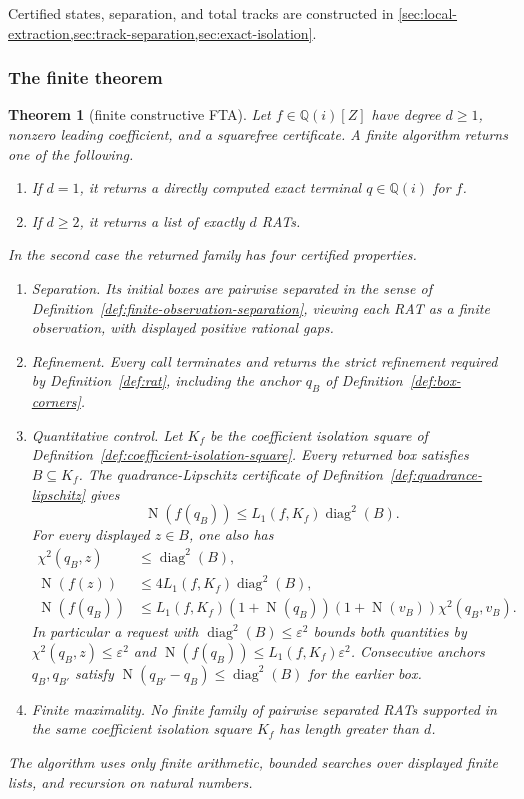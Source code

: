 \documentclass[11pt]{article}
\newtheorem{theorem}{Theorem}[section]
\newcommand{\Qi}{\mathbb{Q}(i)}
\newcommand{\Norm}[1]{\operatorname{N}\!\left(#1\right)}
\newcommand{\diamq}{\operatorname{diag}^{2}}
\newcommand{\eps}{\varepsilon}
\newcommand{\Defref}[1]{Definition~\ref{#1}}
\begin{document}
Certified states, separation, and total tracks are constructed in
\cref{sec:local-extraction,sec:track-separation,sec:exact-isolation}.

\subsubsection{The finite theorem}

\begin{theorem}[finite constructive FTA]
\label{thm:main}
Let $f\in\Qi[Z]$ have degree $d\ge1$, nonzero leading coefficient, and a
squarefree certificate.  A finite algorithm returns one of the following.
\begin{enumerate}[label=(\roman*)]
\item If $d=1$, it returns a directly computed exact terminal $q\in\Qi$ for
$f$.
\item If $d\ge2$, it returns a list of exactly $d$ RATs.
\end{enumerate}
In the second case the returned family has four certified properties.
\begin{enumerate}[label=(\alph*)]
\item \emph{Separation.}  Its initial boxes are pairwise separated in the
sense of \Defref{def:finite-observation-separation}, viewing each RAT as a
finite observation, with displayed positive rational gaps.
\item \emph{Refinement.}  Every call terminates and returns the strict
refinement required by \Defref{def:rat}, including the anchor $q_B$ of
\Defref{def:box-corners}.
\item \emph{Quantitative control.}  Let $K_f$ be the coefficient isolation
square of \Defref{def:coefficient-isolation-square}.  Every returned box
satisfies $B\subseteq K_f$.  The quadrance-Lipschitz certificate of
\Defref{def:quadrance-lipschitz} gives
\[
             \Norm{f(q_B)}\le L_1(f,K_f)\diamq(B).
\]
For every displayed $z\in B$, one also has
\[
 \begin{aligned}
 \chi^2(q_B,z)&\le\diamq(B),\\
 \Norm{f(z)}&\le4L_1(f,K_f)\diamq(B),\\
 \Norm{f(q_B)}&\le
 L_1(f,K_f)(1+\Norm{q_B})(1+\Norm{v_B})\chi^2(q_B,v_B).
 \end{aligned}
\]
In particular a request with $\diamq(B)\le\eps^2$ bounds both quantities by
$\chi^2(q_B,z)\le\eps^2$ and
$\Norm{f(q_B)}\le L_1(f,K_f)\eps^2$.  Consecutive anchors $q_B,q_{B'}$ satisfy
$\Norm{q_{B'}-q_B}\le\diamq(B)$ for the earlier box.
\item \emph{Finite maximality.}  No finite family of pairwise separated RATs
supported in the same coefficient isolation square $K_f$ has length greater
than $d$.
\end{enumerate}
The algorithm uses only finite arithmetic, bounded searches over displayed
finite lists, and recursion on natural numbers.
\end{theorem}
\end{document}

